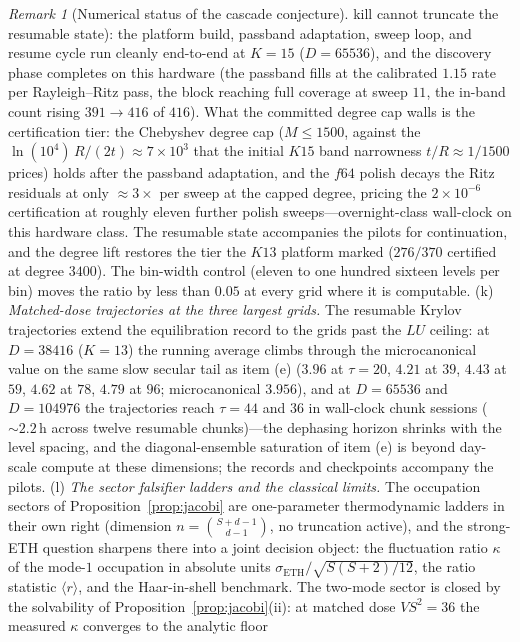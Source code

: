 \documentclass[11pt,a4paper]{article}
\theoremstyle{plain}
\theoremstyle{definition}
\theoremstyle{remark}
\newtheorem{remark}[theorem]{Remark}
\begin{document}
\begin{remark}[Numerical status of the cascade conjecture]
kill cannot truncate the resumable state): the platform build, passband
adaptation, sweep loop, and resume cycle run cleanly end-to-end at
$K=15$ ($D=65536$), and the discovery phase completes on this hardware
(the passband fills at the calibrated $1.15$ rate per Rayleigh--Ritz pass,
the block reaching full coverage at sweep $11$, the in-band count rising
$391\to416$ of $416$). What the committed degree cap walls is the
certification tier: the Chebyshev degree cap ($M\le1500$, against the
$\ln(10^{4})\,R/(2t)\approx7\times10^{3}$ that the initial $K15$ band
narrowness $t/R\approx1/1500$ prices) holds after the passband adaptation,
and the $f64$ polish decays the Ritz residuals at only
$\approx3\times$ per sweep at the capped degree, pricing the
$2\times10^{-6}$ certification at roughly eleven further polish
sweeps---overnight-class wall-clock on this hardware class. The resumable
state accompanies the pilots for continuation, and the degree lift
restores the tier the $K13$ platform marked ($276/370$ certified at
degree $3400$).
The bin-width control (eleven to one hundred sixteen levels per
bin) moves the ratio by less than $0.05$ at every grid where it is computable.
(k) \emph{Matched-dose trajectories at the three largest grids.} The
resumable Krylov trajectories extend the equilibration record to the grids
past the $LU$ ceiling: at $D=38416$ ($K=13$) the running average climbs
through the microcanonical value on the same slow secular tail as item (e)
($3.96$ at $\tau=20$, $4.21$ at $39$, $4.43$ at $59$, $4.62$ at $78$, $4.79$
at $96$; microcanonical $3.956$), and at $D=65536$ and $D=104976$ the
trajectories reach $\tau=44$ and $36$ in wall-clock chunk sessions
($\sim2.2$\,h across twelve resumable chunks)---the dephasing horizon
shrinks with the level spacing, and the diagonal-ensemble saturation of item
(e) is beyond day-scale compute at these dimensions; the records and
checkpoints accompany the pilots.
(l) \emph{The sector falsifier ladders and the classical limits.} The
occupation sectors of Proposition~\ref{prop:jacobi} are one-parameter
thermodynamic ladders in their own right (dimension
$n=\binom{S+d-1}{d-1}$, no truncation active), and the strong-ETH question
sharpens there into a joint decision object: the fluctuation ratio $\kappa$
of the mode-$1$ occupation in absolute units
$\sigma_{\mathrm{ETH}}/\sqrt{S(S+2)/12}$, the ratio statistic $\langle
r\rangle$, and the Haar-in-shell benchmark. The two-mode sector is closed
by the solvability of Proposition~\ref{prop:jacobi}(ii): at matched dose
$VS^{2}=36$ the measured $\kappa$ converges to the analytic floor

\end{remark}
\end{document}
